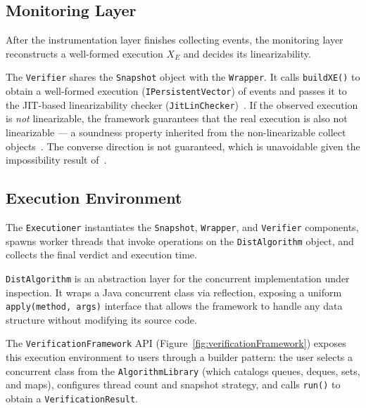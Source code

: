 \documentclass[preprint,12pt]{elsarticle}
\begin{document}
\subsection{Monitoring Layer}
\label{subsec:monitoring}

After the instrumentation layer finishes collecting events, the monitoring
layer reconstructs a well-formed execution $X_E$ and decides its
linearizability.

The \texttt{Verifier} shares the \texttt{Snapshot} object with the
\texttt{Wrapper}. It calls \texttt{buildXE()} to obtain a well-formed execution
(\texttt{IPersistentVector}) of events and passes it to the
JIT-based linearizability checker (\texttt{JitLinChecker})~\cite{lowe2017}. 
If the observed execution
is \emph{not} linearizable, the framework guarantees that the real execution
is also not linearizable --- a soundness property inherited from the
non-linearizable collect objects~\cite{RC24}. The converse direction is not
guaranteed, which is unavoidable given the impossibility result
of~\cite{CR25_JACM}.

\subsection{Execution Environment}
\label{subsec:execution}

The \texttt{Executioner} instantiates the
\texttt{Snapshot}, \texttt{Wrapper}, and \texttt{Verifier} components, spawns
worker threads that invoke operations on the \texttt{DistAlgorithm} object,
and collects the final verdict and execution time.

\texttt{DistAlgorithm} is an abstraction layer for the concurrent
implementation under inspection. It wraps a Java concurrent class
via reflection, exposing a uniform \texttt{apply(method, args)} interface
that allows the framework to handle any data structure without modifying
its source code.

The \texttt{VerificationFramework} API (Figure~\ref{fig:verificationFramework})
exposes this execution environment to users through a builder pattern:
the user selects a concurrent class from the \texttt{AlgorithmLibrary}
(which catalogs queues, deques, sets, and maps), configures thread count
and snapshot strategy, and calls \texttt{run()} to obtain a
\texttt{VerificationResult}.
\end{document}
